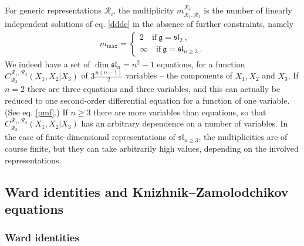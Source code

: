 \documentclass[12pt, a4paper, notitlepage, twoside]{report}
\numberwithin{equation}{section}
\theoremstyle{break}
\begin{document}
For generic representations $\mathcal{R}_i$, the multiplicity $m_{\mathcal{R}_1,\mathcal{R}_2}^{\mathcal{R}_3}$ is the number of linearly independent solutions of eq. \eqref{dddc} in the absence of further constraints, namely
\begin{align}
 m_{\mathrm{max}} = \left\{\begin{array}{l}  2 \quad \text{if}\ \mathfrak{g}=\mathfrak{sl}_2\ , \\ \infty \quad \text{if}\ \mathfrak{g}=\mathfrak{sl}_{n\geq 3}\ . \end{array}\right. 
\end{align}
We indeed have a set of $\dim \mathfrak{sl}_n=n^2-1$ equations, for a function $C^{\mathcal{R}_1,\mathcal{R}_2}_{\mathcal{R}_3}(X_1,X_2|X_3)$ of $3\frac{n(n-1)}{2}$ variables -- the components of $X_1,X_2$ and $X_3$.
If $n=2$ there are three equations and three variables, and this can actually be reduced to one second-order differential equation for a function of one variable. (See eq. \eqref{pmf}.)
If $n\geq 3$ there are more variables than equations, so that $C^{\mathcal{R}_1,\mathcal{R}_2}_{\mathcal{R}_3}(X_1,X_2|X_3)$ has an arbitrary dependence on a number of variables.
In the case of finite-dimensional representations of $\mathfrak{sl}_{n\geq 3}$, the multiplicities are of course finite, but they can take arbitrarily high values, depending on the involved representations.

\subsection{Ward identities and Knizhnik--Zamolodchikov equations \label{secwikz}}

\subsubsection{Ward identities}
\end{document}
